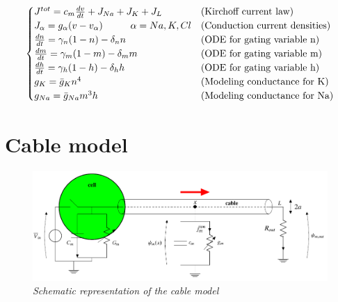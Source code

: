 \documentclass[12pt, a4paper]{report}
\begin{document}
\begin{equation}
\begin{cases}
J^{tot} = c_m \frac{d v}{d t} + J_{Na} + J_K +J_L  & \text{(Kirchoff current law)}\\
J_\alpha = g_\alpha (v-v_\alpha) \hspace{1 cm}  \alpha = Na,K,Cl & \text{(Conduction current densities)}\\
\frac{dn}{dt} = \gamma_n(1-n) - \delta_n n & \text{(ODE for gating variable n)} \\
\frac{dm}{dt} = \gamma_m(1-m) - \delta_m m & \text{(ODE for gating variable m)}\\
\frac{dh}{dt} = \gamma_h(1-h) - \delta_h h & \text{(ODE for gating variable h)}\\
g_K = \bar{g}_K n^4 & \text{(Modeling conductance for K)}\\
g_{Na} = \bar{g}_{Na} m^3h  & \text{(Modeling conductance for Na)}

\end{cases}
\end{equation}

	


\section{Cable model} \label{section cable}

\begin{figure}[H]
	\begin{center}
		\hspace*{-0.7cm}
		\includegraphics[scale=0.65]{cable.png} 
	\end{center} 
	\caption{\textit{Schematic representation of the cable model}}
	\label{cable}
\end{figure}
\end{document}
